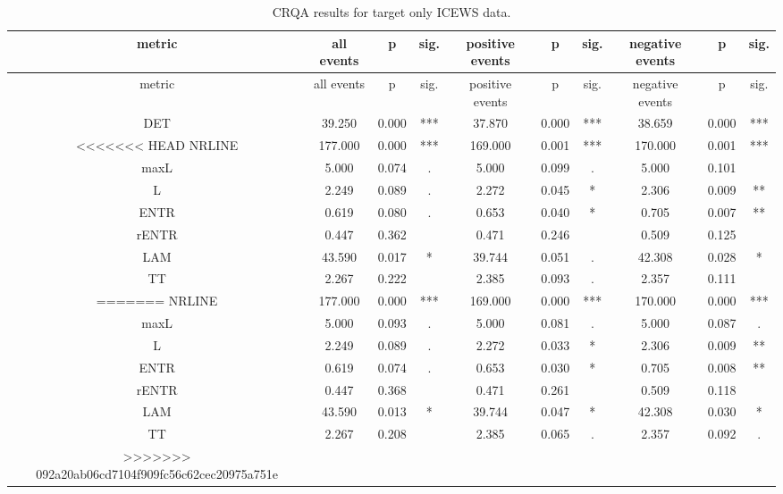 \begin{appendix}
\begin{longtable}[]{@{}cccccccccc@{}}
\caption{CRQA results for target only ICEWS data.}\tabularnewline
\toprule
metric & all events & p & sig. & positive events & p & sig. & negative
events & p & sig.\tabularnewline
\midrule
\endfirsthead
\toprule
metric & all events & p & sig. & positive events & p & sig. & negative
events & p & sig.\tabularnewline
\midrule
\endhead
DET & 39.250 & 0.000 & *** & 37.870 & 0.000 & *** & 38.659 & 0.000 &
***\tabularnewline
<<<<<<< HEAD
NRLINE & 177.000 & 0.000 & *** & 169.000 & 0.001 & *** & 170.000 & 0.001
& ***\tabularnewline
maxL & 5.000 & 0.074 & . & 5.000 & 0.099 & . & 5.000 & 0.101
&\tabularnewline
L & 2.249 & 0.089 & . & 2.272 & 0.045 & * & 2.306 & 0.009 &
**\tabularnewline
ENTR & 0.619 & 0.080 & . & 0.653 & 0.040 & * & 0.705 & 0.007 &
**\tabularnewline
rENTR & 0.447 & 0.362 & & 0.471 & 0.246 & & 0.509 & 0.125
&\tabularnewline
LAM & 43.590 & 0.017 & * & 39.744 & 0.051 & . & 42.308 & 0.028 &
*\tabularnewline
TT & 2.267 & 0.222 & & 2.385 & 0.093 & . & 2.357 & 0.111
&\tabularnewline
=======
NRLINE & 177.000 & 0.000 & *** & 169.000 & 0.000 & *** & 170.000 & 0.000
& ***\tabularnewline
maxL & 5.000 & 0.093 & . & 5.000 & 0.081 & . & 5.000 & 0.087 &
.\tabularnewline
L & 2.249 & 0.089 & . & 2.272 & 0.033 & * & 2.306 & 0.009 &
**\tabularnewline
ENTR & 0.619 & 0.074 & . & 0.653 & 0.030 & * & 0.705 & 0.008 &
**\tabularnewline
rENTR & 0.447 & 0.368 & & 0.471 & 0.261 & & 0.509 & 0.118
&\tabularnewline
LAM & 43.590 & 0.013 & * & 39.744 & 0.047 & * & 42.308 & 0.030 &
*\tabularnewline
TT & 2.267 & 0.208 & & 2.385 & 0.065 & . & 2.357 & 0.092 &
.\tabularnewline
>>>>>>> 092a20ab06cd7104f909fc56c62cec20975a751e
\bottomrule
\end{longtable}


\end{appendix}
